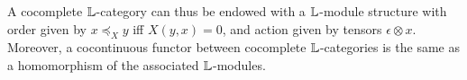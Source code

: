 A cocomplete $\mathbb{L}$-category can thus be endowed with a $\mathbb{L}$-module structure with order given by  $x\preceq_{X}y $ iff $X(y,x)=0$, and 
action given by tensors $\epsilon \otimes x$. 
Moreover, a cocontinuous functor between cocomplete $\mathbb{L}$-categories is the same as a homomorphism of the associated $\mathbb{L}$-modules. 
%
%
%
%
%

%

%
%

